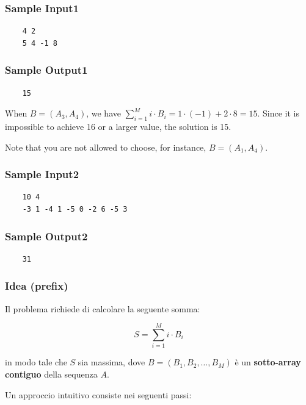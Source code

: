 \subsubsection*{Sample Input1}
\begin{verbatim}
	4 2
	5 4 -1 8
\end{verbatim}

\subsubsection*{Sample Output1}
\begin{verbatim}
	15
\end{verbatim}


\vspace{0.5cm}

When $B=(A_3,A_4)$, we have $\sum_{i=1}^{M} i\cdot B_i=1\cdot(-1)+2\cdot8=15$. Since it is impossible to achieve 
16 or a larger value, the solution is 
15.

Note that you are not allowed to choose, for instance, 
$B=(A_1, A_4)$.

\subsubsection*{Sample Input2}

\begin{verbatim}
	10 4
	-3 1 -4 1 -5 0 -2 6 -5 3
\end{verbatim}

\subsubsection*{Sample Output2}
\begin{verbatim}
	31
\end{verbatim}


\subsubsection*{Idea (prefix)} 

Il problema richiede di calcolare la seguente somma:

\begin{equation}
	S = \sum_{i=1}^{M} i \cdot B_i
\end{equation}

in modo tale che \(S\) sia massima, dove
\(B = (B_1, B_2, \dots, B_M)\) è un \textbf{sotto-array contiguo} della sequenza \(A\).

Un approccio intuitivo consiste nei seguenti passi:

